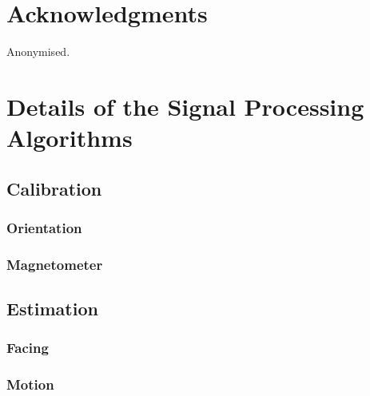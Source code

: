\documentclass{nime-alternate} %
\begin{document}
\section{Acknowledgments}
Anonymised.


 

\appendix
\section{Details of the Signal Processing Algorithms}
\label{appendix:signal-processing}

\subsection{Calibration}
\subsubsection{Orientation}
\subsubsection{Magnetometer}

\subsection{Estimation}
\subsubsection{Facing}
\subsubsection{Motion}
\end{document}

